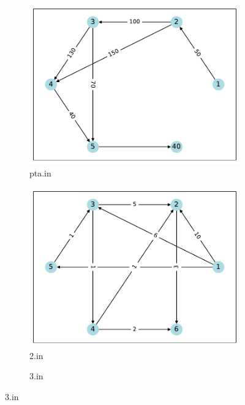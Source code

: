 \documentclass[a4paper,oneside]{book}
\begin{document}
\begin{figure}[!ht]
    \centering
    \caption{Test Graphs}
    \begin{subfigure}[b]{0.3\textwidth}
        \centering
        \caption{pta.in}
        \includegraphics[width=\textwidth]{src/pta.pdf}
    \end{subfigure}
    \begin{subfigure}[b]{0.3\textwidth}
        \centering
        \caption{2.in}
        \includegraphics[width=\textwidth]{src/2.pdf}
    \end{subfigure}
    \begin{subfigure}[b]{0.3\textwidth}
        \centering
        \caption{3.in}

\end{subfigure}
\end{figure}
\end{document}
